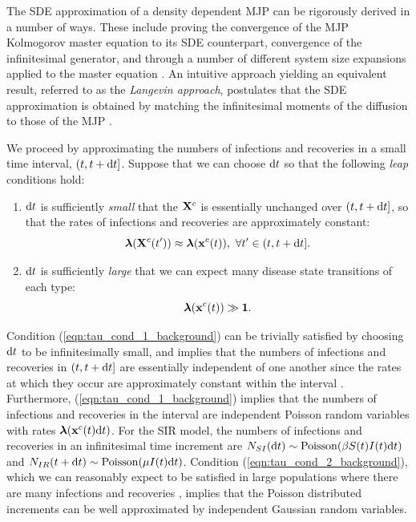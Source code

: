 The SDE approximation of a density dependent MJP can be rigorously derived in a number of ways. These include proving the convergence of the MJP Kolmogorov master equation to its SDE counterpart, convergence of the infinitesimal generator, and through a number of different system size expansions applied to the master equation \cite{fuchs2013inference}. An intuitive approach yielding an equivalent result, referred to as the \textit{Langevin approach}, postulates that the SDE approximation is obtained by matching the infinitesimal moments of the diffusion to those of the MJP \cite{fuchs2013inference,gillespie2000chemical,wallace2012linear}. 

We proceed by approximating the numbers of infections and recoveries in a small time interval, $ (t, t+\mathrm{d} t] $. Suppose that we can choose $ \mathrm{d} t $ so that the following \textit{leap} conditions hold:
\begin{enumerate}
	\item $ \mathrm{d} t $ is sufficiently \textit{small} that the $ \mathbf{X}^c $ is essentially unchanged over $ (t,t+\mathrm{d} t] $, so that the rates of infections and recoveries are approximately constant: 
	\begin{equation}\label{eqn:tau_cond_1_background}
	\boldsymbol{\lambda}(\mathbf{X}^c(t^\prime)) \approx \boldsymbol{\lambda}(\mathbf{x}^c(t)),\ \forall t^\prime \in (t,t+\mathrm{d} t].
	\end{equation}
	\item $ \mathrm{d} t $ is sufficiently \textit{large} that we can expect many disease state transitions of each type:
	\begin{equation}\label{eqn:tau_cond_2_background}
	\boldsymbol{\lambda}(\mathbf{x}^c(t)) \gg \boldsymbol{1}.
	\end{equation}
\end{enumerate}
Condition (\ref{eqn:tau_cond_1_background}) can be trivially satisfied by choosing $ \mathrm{d} t $ to be infinitesimally small, and implies that the numbers of infections and recoveries in $ (t,t+\mathrm{d} t] $ are essentially independent of one another since the rates at which they occur are approximately constant within the interval \cite{gillespie2000chemical}. Furthermore, (\ref{eqn:tau_cond_1_background}) implies that the numbers of infections and recoveries in the interval are independent Poisson random variables with rates $ \boldsymbol{\lambda}(\mathbf{x}^c(t)\mathrm{d} t) $. For the SIR model, the numbers of infections and recoveries in an infinitesimal time increment are $ N_{SI}(\mathrm{d} t) \sim \mathrm{Poisson}(\beta S(t)I(t)\mathrm{d} t) $ and $ N_{IR}(t+\mathrm{d} t) \sim \mathrm{Poisson}(\mu I(t)\mathrm{d} t) $. Condition (\ref{eqn:tau_cond_2_background}), which we can reasonably expect to be satisfied in large populations where there are many infections and recoveries \cite{wallace2012linear}, implies that the Poisson distributed increments can be well approximated by independent Gaussian random variables. 

